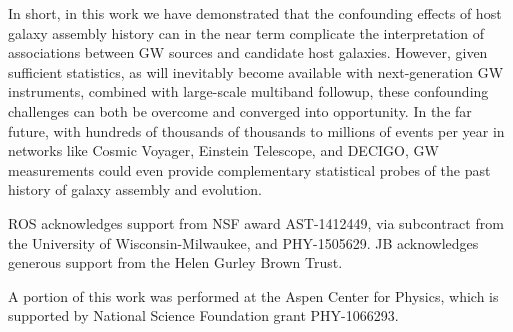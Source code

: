 \documentclass[nofootinbib,twocolumn,prd]{emulateapj}
\newcommand\jillianremark[1]{{\color{blue}#1}}
\begin{document}
In short, in this work we have demonstrated that  the confounding effects of host galaxy assembly history can in the
near term complicate the interpretation of associations between GW sources and candidate host galaxies.   However, given sufficient
statistics, as will inevitably become available with next-generation GW instruments, combined with large-scale
multiband followup, these confounding challenges can  both be overcome and converged into opportunity.   In the far future,  with hundreds of thousands of thousands to millions of events per year in
networks like Cosmic Voyager, Einstein Telescope, and DECIGO, GW measurements could even  provide complementary statistical probes of the past history of
galaxy assembly and evolution.  
%












\begin{acknowledgements}
ROS acknowledges support from NSF award AST-1412449, via subcontract from the University of Wisconsin-Milwaukee, and PHY-1505629.
%
JB acknowledges generous support  from the Helen Gurley Brown Trust.

A portion of this work was performed at the Aspen Center for Physics, which is supported by National Science Foundation grant PHY-1066293.
\end{acknowledgements}







\end{document}

